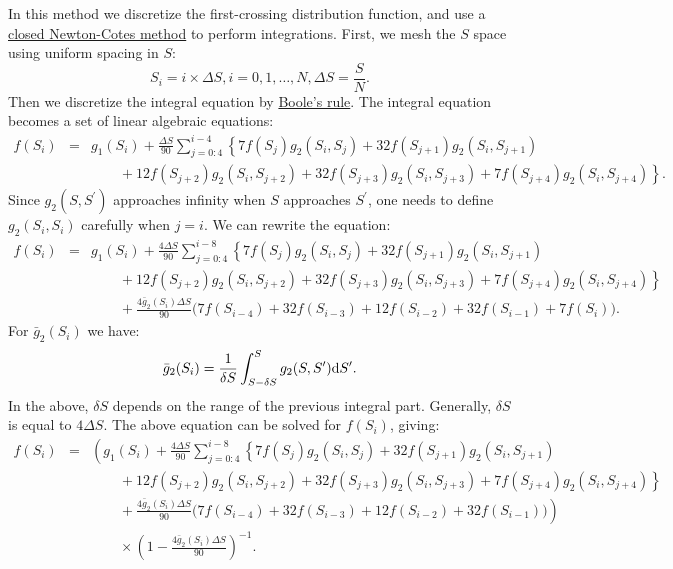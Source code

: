 In this method we discretize the first-crossing distribution function, and use a \href{http://en.wikipedia.org/wiki/Newton%E2%80%93Cotes_formulas#Closed_Newton.E2.80.93Cotes_formulae}{closed Newton-Cotes method} to perform integrations. First, we mesh the $S$ space using uniform spacing in $S$:
\begin{equation}
  S_i = i \times \Delta S , i = 0, 1, \dots, N, \Delta S = \frac{S}{N}.
\end{equation}
Then we discretize the integral equation by \href{http://en.wikipedia.org/wiki/Boole%27s_rule}{Boole's rule}. The integral equation becomes a set of linear algebraic equations:
\begin{eqnarray}
 f(S_i)  &=&  g_1(S_i)  +  \frac{ \Delta S}{90}  \sum_{j=0:4}^{i-4}   \left\{ 7 f(S_j) g_2(S_i, S_j) + 32 f(S_{j+1}) g_2(S_i, S_{j+1})  \right.\nonumber\\
 &&\qquad \left. {}     + 12 f(S_{j+2}) g_2(S_i, S_{j+2}) + 32 f(S_{j+3}) g_2(S_i, S_{j+3}) + 7 f(S_{j+4}) g_2(S_i, S_{j+4})  \right\}.
\end{eqnarray}
Since $g_2(S, S^\prime)$ approaches infinity when $S$ approaches $S^\prime$, one needs to define $g_2(S_i, S_i)$ carefully when $j = i$. We can rewrite the equation:
\begin{eqnarray}
       f(S_i)  &=&  g_1(S_i)  +  \frac{ 4 \Delta S}{90}  \sum_{j=0:4}^{i-8}   \left\{ 7 f(S_j) g_2(S_i, S_j) + 32 f(S_{j+1}) g_2(S_i, S_{j+1})  \right.\nonumber\\
       &&\qquad \left. {}     + 12 f(S_{j+2}) g_2(S_i, S_{j+2}) + 32 f(S_{j+3}) g_2(S_i, S_{j+3}) + 7 f(S_{j+4}) g_2(S_i, S_{j+4})  \right\} \nonumber\\ 
       &&\qquad {}     + \frac{ 4  \bar{g}_2(S_i) \Delta S}{90} \Big( 7 f(S_{i-4})  + 32 f(S_{i-3}) + 12 f(S_{i-2}) + 32 f(S_{i-1}) + 7 f(S_i)  \Big).
\end{eqnarray}
For $ \bar{g}_2(S_i)$ we have:
\begin{equation}
  \bar{g}_2(S_i) = \frac{1}{\delta S} \int_{S - \delta S}^S g_2(S,S^\prime){\rm d}S^\prime.
\end{equation}
In the above, $\delta S$ depends on the range of the previous integral part. Generally, $\delta S$ is equal to $4 \Delta S$. The above equation can be solved for $f(S_i)$, giving:
\begin{eqnarray}
       f(S_i)  &=&  \left( g_1(S_i)  +  \frac{ 4 \Delta S}{90}  \sum_{j=0:4}^{i-8}   \left\{ 7 f(S_j) g_2(S_i, S_j)  + 32 f(S_{j+1}) g_2(S_i, S_{j+1})  \right.\right.\nonumber\\
       &&\qquad \left.\left. {}     + 12 f(S_{j+2}) g_2(S_i, S_{j+2})  + 32 f(S_{j+3}) g_2(S_i, S_{j+3}) + 7 f(S_{j+4}) g_2(S_i, S_{j+4})    \right\} \right. \nonumber\\ 
       &&\qquad \left. {}     + \frac{4  \bar{g}_2(S_i) \Delta S }{90} \Big( 7 f(S_{i-4})  + 32 f(S_{i-3}) + 12 f(S_{i-2})  + 32 f(S_{i-1})   \Big) \right) \nonumber\\
       &&\qquad {}     \times \left( 1 -  \frac{ 4  \bar{g}_2(S_i) \Delta S}{90}  \right)^{-1}.
\end{eqnarray}
